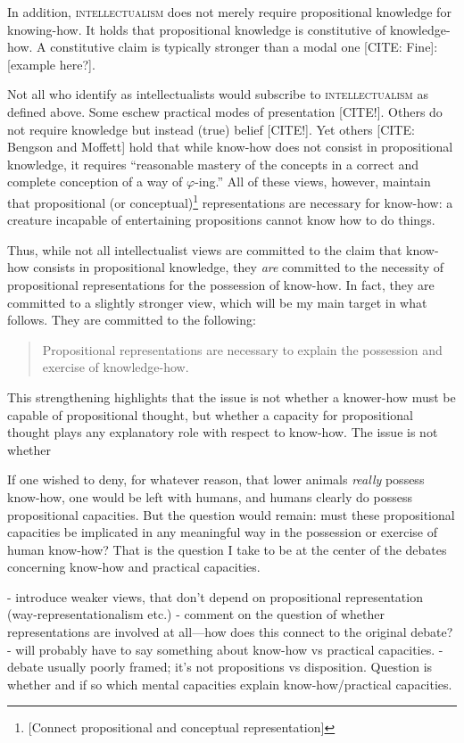 In addition, \textsc{intellectualism} does not merely require propositional knowledge for knowing-how.
It holds that propositional knowledge is constitutive of knowledge-how.
A constitutive claim is typically stronger than a modal one [CITE: Fine]: [example here?].

Not all who identify as intellectualists would subscribe to \textsc{intellectualism} as defined above.
Some eschew practical modes of presentation [CITE!].
Others do not require knowledge but instead (true) belief [CITE!].
Yet others [CITE: Bengson and Moffett] hold that while know-how does not consist in propositional knowledge, it requires ``reasonable mastery of the concepts in a correct and complete conception of a way of $\varphi$-ing.''
All of these views, however, maintain that propositional (or conceptual)\footnote{[Connect propositional and conceptual representation]} representations are necessary for know-how: a creature incapable of entertaining propositions cannot know how to do things.

Thus, while not all intellectualist views are committed to the claim that know-how consists in propositional knowledge, they \emph{are} committed to the necessity of propositional representations for the possession of know-how.
In fact, they are committed to a slightly stronger view, which will be my main target in what follows.
They are committed to the following:
\begin{quote}
	Propositional representations are necessary to explain the possession and exercise of knowledge-how.
\end{quote}





This strengthening highlights that the issue is not whether a knower-how must be capable of propositional thought, but whether a capacity for propositional thought plays any explanatory role with respect to know-how.
The issue is not whether 

If one wished to deny, for whatever reason, that lower animals \emph{really} possess know-how, one would be left with humans, and humans clearly do possess propositional capacities.
But the question would remain: must these propositional capacities be implicated in any meaningful way in the possession or exercise of human know-how?
That is the question I take to be at the center of the debates concerning know-how and practical capacities.

- introduce weaker views, that don't depend on propositional representation (way-representationalism etc.)
- comment on the question of whether representations are involved at all—how does this connect to the original debate?
- will probably have to say something about know-how vs practical capacities.
- debate usually poorly framed; it's not propositions vs disposition. Question is whether and if so which mental capacities explain know-how/practical capacities.
